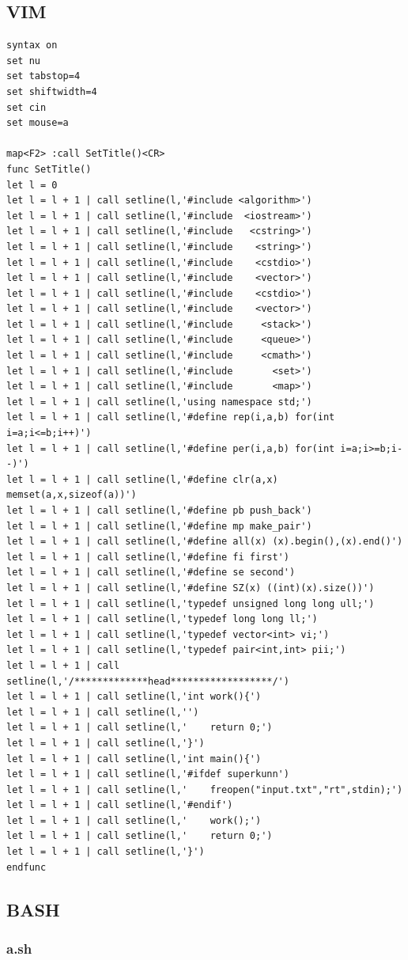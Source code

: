 \documentclass[twoside]{article}
\begin{document}
\subsection{VIM}
\begin{lstlisting}
syntax on
set nu
set tabstop=4
set shiftwidth=4
set cin
set mouse=a

map<F2> :call SetTitle()<CR>
func SetTitle()
let l = 0
let l = l + 1 | call setline(l,'#include <algorithm>')
let l = l + 1 | call setline(l,'#include  <iostream>')
let l = l + 1 | call setline(l,'#include   <cstring>')
let l = l + 1 | call setline(l,'#include    <string>')
let l = l + 1 | call setline(l,'#include    <cstdio>')
let l = l + 1 | call setline(l,'#include    <vector>')
let l = l + 1 | call setline(l,'#include    <cstdio>')
let l = l + 1 | call setline(l,'#include    <vector>')
let l = l + 1 | call setline(l,'#include     <stack>')
let l = l + 1 | call setline(l,'#include     <queue>')
let l = l + 1 | call setline(l,'#include     <cmath>')
let l = l + 1 | call setline(l,'#include       <set>')
let l = l + 1 | call setline(l,'#include       <map>')
let l = l + 1 | call setline(l,'using namespace std;')
let l = l + 1 | call setline(l,'#define rep(i,a,b) for(int i=a;i<=b;i++)')
let l = l + 1 | call setline(l,'#define per(i,a,b) for(int i=a;i>=b;i--)')
let l = l + 1 | call setline(l,'#define clr(a,x) memset(a,x,sizeof(a))')
let l = l + 1 | call setline(l,'#define pb push_back')
let l = l + 1 | call setline(l,'#define mp make_pair')
let l = l + 1 | call setline(l,'#define all(x) (x).begin(),(x).end()')
let l = l + 1 | call setline(l,'#define fi first')
let l = l + 1 | call setline(l,'#define se second')
let l = l + 1 | call setline(l,'#define SZ(x) ((int)(x).size())')
let l = l + 1 | call setline(l,'typedef unsigned long long ull;')
let l = l + 1 | call setline(l,'typedef long long ll;')
let l = l + 1 | call setline(l,'typedef vector<int> vi;')
let l = l + 1 | call setline(l,'typedef pair<int,int> pii;')
let l = l + 1 | call setline(l,'/*************head******************/')
let l = l + 1 | call setline(l,'int work(){')
let l = l + 1 | call setline(l,'')
let l = l + 1 | call setline(l,'    return 0;')
let l = l + 1 | call setline(l,'}')
let l = l + 1 | call setline(l,'int main(){')
let l = l + 1 | call setline(l,'#ifdef superkunn')
let l = l + 1 | call setline(l,'    freopen("input.txt","rt",stdin);')
let l = l + 1 | call setline(l,'#endif')
let l = l + 1 | call setline(l,'    work();')
let l = l + 1 | call setline(l,'    return 0;')
let l = l + 1 | call setline(l,'}')
endfunc
\end{lstlisting}
\subsection{BASH}
\subsubsection{a.sh}
\end{document}

